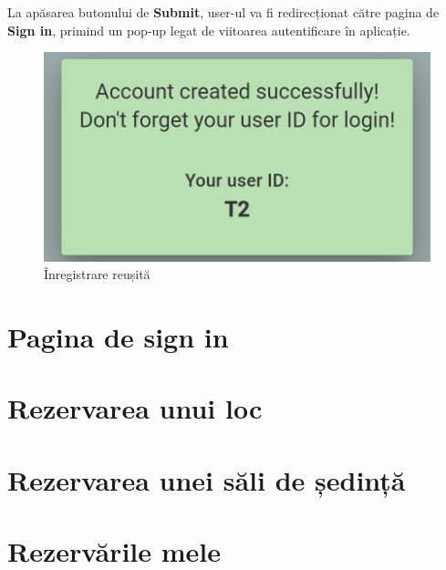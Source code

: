 La apăsarea butonului de \textbf{Submit}, user-ul va fi redirecționat către pagina de \textbf{Sign in}, primind un pop-up legat de viitoarea autentificare în aplicație.  

\begin{figure}[!htb]
    \centering
    \includegraphics[width=0.9\linewidth]{images/autentf.png}
    \caption{Înregistrare reușită}
    \label{fig:autentf}
\end{figure}

\section{Pagina de sign in}

\section{Rezervarea unui loc}

\section{Rezervarea unei săli de ședință}

\section{Rezervările mele}




